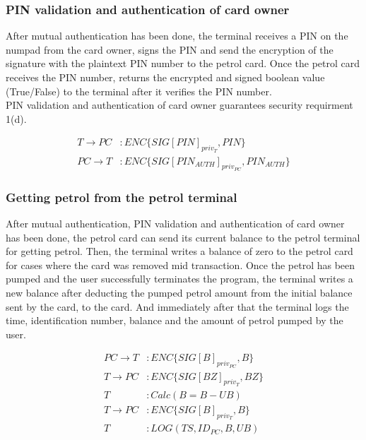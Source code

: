 \subsubsection{PIN validation and authentication of card owner}
After mutual authentication has been done, the terminal receives a PIN on the numpad from the card owner, signs the PIN and send the encryption of the signature with the plaintext PIN number to the petrol card. Once the petrol card receives the PIN number, returns the encrypted and signed boolean value (True/False) to the terminal after it verifies the PIN number. \\

PIN validation and authentication of card owner guarantees security requirment 1(d).

\begin{equation}\nonumber
\begin{split}
T \to PC&: ENC\{SIG[PIN]_{priv_T}, PIN\}\\
PC \to T&: ENC\{SIG[PIN_{AUTH}]_{priv_{PC}}, PIN_{AUTH}\}
\end{split} 
\end{equation}

\subsubsection{Getting petrol from the petrol terminal}
After mutual authentication, PIN validation and authentication of card owner has been done, the petrol card can send its current balance to the petrol terminal for getting petrol. Then, the terminal writes a balance of zero to the petrol card for cases where the card was removed mid transaction. Once the petrol has been pumped and the user successfully terminates the program, the terminal writes a new balance after deducting the pumped petrol amount from the initial balance sent by the card, to the card. And immediately after that the terminal logs the time, identification number, balance and the amount of petrol pumped by the user.

\begin{equation}\nonumber
\begin{split}
PC \to T&: ENC\{SIG[B]_{priv_{PC}}, B\}\\
T \to PC&: ENC\{SIG[BZ]_{priv_T}, BZ\}\\
T&: Calc(B = B - UB)\\
T \to PC&: ENC\{SIG[B]_{priv_T}, B\}\\
T&: LOG(TS, ID_{PC}, B, UB)
\end{split} 
\end{equation}


